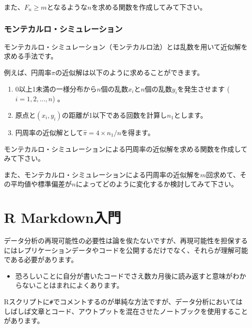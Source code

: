 \documentclass[]{bxjsreport}
\providecommand{\tightlist}{%
  \setlength{\itemsep}{0pt}\setlength{\parskip}{0pt}}
\let\asdf\section
\renewcommand{\section}{\chapter}
\let\asdff\subsection
\renewcommand{\subsection}{\asdf}
\renewcommand{\subsubsection}{\asdff}
\begin{document}
また、\(F_n \geq m\)となるような\(n\)を求める関数を作成してみて下さい。

\hypertarget{ux30e2ux30f3ux30c6ux30abux30ebux30edux30b7ux30dfux30e5ux30ecux30fcux30b7ux30e7ux30f3}{%
\subsubsection{モンテカルロ・シミュレーション}\label{ux30e2ux30f3ux30c6ux30abux30ebux30edux30b7ux30dfux30e5ux30ecux30fcux30b7ux30e7ux30f3}}

モンテカルロ・シミュレーション（モンテカルロ法）とは乱数を用いて近似解を求める手法です。

例えば、円周率\(\pi\)の近似解は以下のように求めることができます。

\begin{enumerate}
\def\labelenumi{\arabic{enumi}.}
\tightlist
\item
  0以上1未満の一様分布から\(n\)個の乱数\(x_i\)と\(n\)個の乱数\(y_i\)を発生させます (\(i = 1,2,\ldots,n\)) 。
\item
  原点と\((x_i,y_i)\)の距離が1以下である回数を計算し\(n_1\)とします。
\item
  円周率の近似解として\(\hat{\pi} = 4 \times n_1/n\)を得ます。
\end{enumerate}

モンテカルロ・シミュレーションによる円周率の近似解を求める関数を作成してみて下さい。

また、モンテカルロ・シミュレーションによる円周率の近似解を\(m\)回求めて、その平均値や標準偏差が\(n\)によってどのように変化するか検討してみて下さい。

\hypertarget{rmakdown}{%
\section{R Markdown入門}\label{rmakdown}}

データ分析の再現可能性の必要性は論を俟たないですが、再現可能性を担保するにはレプリケーションデータやコードを公開するだけでなく、それらが理解可能である必要があります。

\begin{itemize}
\tightlist
\item
  恐ろしいことに自分が書いたコードでさえ数カ月後に読み返すと意味がわからないことはまれによくあります。
\end{itemize}

Rスクリプトに\texttt{\#}でコメントするのが単純な方法ですが、データ分析においてはしばしば文章とコード、アウトプットを混在させたノートブックを使用することがあります。
\end{document}
